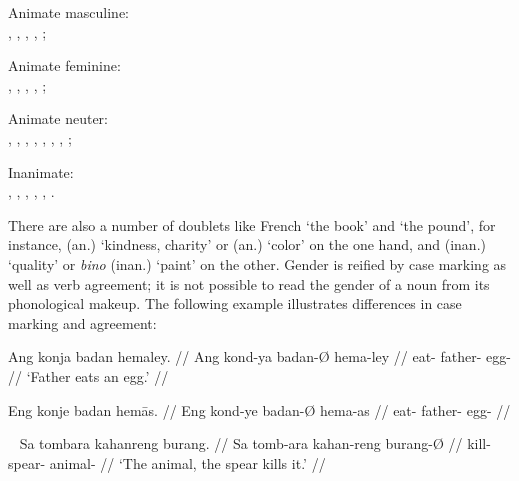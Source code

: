 \pex
	\a Animate masculine:\\
		, 
		, 
		, 
		, 
		;
	
	\a Animate feminine:\\
		, 
		, 
		, 
		, 
		;
	
	\a Animate neuter:\\
		,
		,
		,
		,
		,
		, 
		,
		;
	
	\a Inanimate:\\
		,
		,
		,
		,
		,
		.
\xe

There are also a number of doublets like French  `the book' and 
 `the pound', for instance,   (an.) `kindness, 
charity' or   (an.) `color' on the one hand, and 
  (inan.) `quality' or  \emph{bino} (inan.) 
`paint' on the other. Gender is reified by case marking as well as verb 
agreement; it is not possible to read the gender of a noun from its phonological 
makeup. The following example illustrates differences in case marking and 
agreement:

\pex\label{ex:gender1}
\a\label{ex:gender1a}\begingl
	\gla Ang konja badan hemaley. //
	\glb Ang kond-ya badan-Ø hema-ley //
	\glc \AgtT{} eat-\TsgM{} father-\Top{} egg-\PargI{} //
	\glft `Father eats an egg.' //
\endgl

\a\label{ex:gender1b}\begingl
	\gla *Eng konje badan hemās. //
	\glb *Eng kond-ye badan-Ø hema-as //
	\glc *\AgtTI{} eat-\TsgF{} father-\Top{} egg-\Parg{} //
\endgl
\xe

\pex~\label{ex:gender2}
\a\label{ex:gender2a}\begingl
	\gla Sa tombara kahanreng burang. //
	\glb Sa tomb-ara kahan-reng burang-Ø //
	\glc \PatT{} kill-\TsgI{} spear-\AargI{} animal-\Parg{} //
	\glft `The animal, the spear kills it.' //
\endgl

